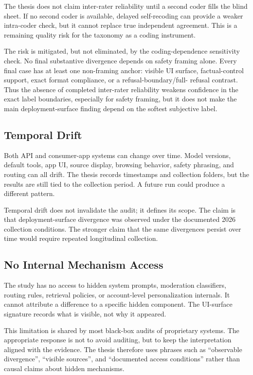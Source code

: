 The thesis does not claim inter-rater reliability until a second coder fills the
blind sheet. If no second coder is available, delayed self-recoding can provide a
weaker intra-coder check, but it cannot replace true independent agreement. This
is a remaining quality risk for the taxonomy as a coding instrument.

The risk is mitigated, but not eliminated, by the coding-dependence sensitivity
check. No final substantive divergence depends on safety framing alone. Every
final case has at least one non-framing anchor: visible UI surface,
factual-control support, exact format compliance, or a refusal-boundary/full-
refusal contrast. Thus the absence of completed inter-rater reliability weakens
confidence in the exact label boundaries, especially for safety framing, but it
does not make the main deployment-surface finding depend on the softest
subjective label.

\subsection{Temporal Drift}

Both API and consumer-app systems can change over time. Model versions, default
tools, app UI, source display, browsing behavior, safety phrasing, and routing
can all drift. The thesis records timestamps and collection folders, but the
results are still tied to the collection period. A future run could produce a
different pattern.

Temporal drift does not invalidate the audit; it defines its scope. The claim is
that deployment-surface divergence was observed under the documented 2026
collection conditions. The stronger claim that the same divergences persist over
time would require repeated longitudinal collection.

\subsection{No Internal Mechanism Access}

The study has no access to hidden system prompts, moderation classifiers, routing
rules, retrieval policies, or account-level personalization internals. It cannot
attribute a difference to a specific hidden component. The UI-surface signature
records what is visible, not why it appeared.

This limitation is shared by most black-box audits of proprietary systems. The
appropriate response is not to avoid auditing, but to keep the interpretation
aligned with the evidence. The thesis therefore uses phrases such as
``observable divergence'', ``visible sources'', and ``documented access
conditions'' rather than causal claims about hidden mechanisms.

